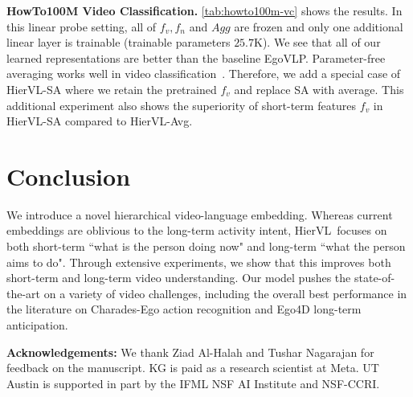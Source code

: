 \documentclass[10pt,twocolumn,letterpaper]{article}
\newcommand{\modelname}[0]{{HierVL}}
\begin{document}
\textbf{HowTo100M Video Classification.} \cref{tab:howto100m-vc} shows the results.  In this linear probe setting, all of $f_v, f_n$ and $Agg$ are frozen and only one additional linear layer is trainable (trainable parameters $25.7$K). We see that all of our learned representations are better than the baseline EgoVLP. Parameter-free averaging works well in video classification~\cite{clip-hitchhiker}. Therefore, we add a special case of \modelname-SA where we retain the pretrained $f_v$ and replace SA with average. This additional experiment also shows the superiority of short-term features $f_v$ in \modelname-SA compared to \modelname-Avg.





 \section{Conclusion}
\label{sec:conclusion}

We introduce a novel hierarchical video-language embedding. Whereas current embeddings are oblivious to the long-term activity intent, \modelname~focuses on both short-term ``what is the person doing now" and long-term ``what the person aims to do". Through extensive experiments, we show that this improves both short-term and long-term video understanding.  Our model pushes the state-of-the-art on a variety of video challenges, including the overall best performance in the literature on Charades-Ego action recognition and Ego4D long-term anticipation. 



\textbf{Acknowledgements:} We thank Ziad Al-Halah and Tushar Nagarajan for feedback on the manuscript.
KG is paid as a research scientist at Meta. UT Austin is supported in part by the IFML NSF AI Institute and NSF-CCRI.



 
{\small


}
\end{document}
